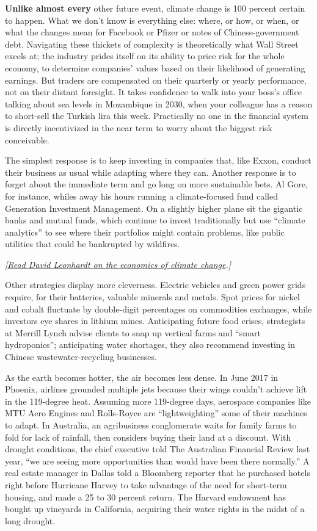 \textbf{Unlike almost every} other future event, climate change is 100
percent certain to happen. What we don't know is everything else: where,
or how, or when, or what the changes mean for Facebook or Pfizer or
notes of Chinese-government debt. Navigating these thickets of
complexity is theoretically what Wall Street excels at; the industry
prides itself on its ability to price risk for the whole economy, to
determine companies' values based on their likelihood of generating
earnings. But traders are compensated on their quarterly or yearly
performance, not on their distant foresight. It takes confidence to walk
into your boss's office talking about sea levels in Mozambique in 2030,
when your colleague has a reason to short-sell the Turkish lira this
week. Practically no one in the financial system is directly
incentivized in the near term to worry about the biggest risk
conceivable.

The simplest response is to keep investing in companies that, like
Exxon, conduct their business as usual while adapting where they can.
Another response is to forget about the immediate term and go long on
more sustainable bets. Al Gore, for instance, whiles away his hours
running a climate-focused fund called Generation Investment Management.
On a slightly higher plane sit the gigantic banks and mutual funds,
which continue to invest traditionally but use ``climate analytics'' to
see where their portfolios might contain problems, like public utilities
that could be bankrupted by wildfires.

\emph{{[}\href{https://www.nytimes3xbfgragh.onion/interactive/2019/04/09/magazine/climate-change-politics-economics.html}{Read
David Leonhardt on the economics of climate change}.{]}}

Other strategies display more cleverness. Electric vehicles and green
power grids require, for their batteries, valuable minerals and metals.
Spot prices for nickel and cobalt fluctuate by double-digit percentages
on commodities exchanges, while investors eye shares in lithium mines.
Anticipating future food crises, strategists at Merrill Lynch advise
clients to snap up vertical farms and ``smart hydroponics'';
anticipating water shortages, they also recommend investing in Chinese
wastewater-recycling businesses.

As the earth becomes hotter, the air becomes less dense. In June 2017 in
Phoenix, airlines grounded multiple jets because their wings couldn't
achieve lift in the 119-degree heat. Assuming more 119-degree days,
aerospace companies like MTU Aero Engines and Rolls-Royce are
``lightweighting'' some of their machines to adapt. In Australia, an
agribusiness conglomerate waits for family farms to fold for lack of
rainfall, then considers buying their land at a discount. With drought
conditions, the chief executive told The Australian Financial Review
last year, ``we are seeing more opportunities than would have been there
normally.'' A real estate manager in Dallas told a Bloomberg reporter
that he purchased hotels right before Hurricane Harvey to take advantage
of the need for short-term housing, and made a 25 to 30 percent return.
The Harvard endowment has bought up vineyards in California, acquiring
their water rights in the midst of a long drought.

